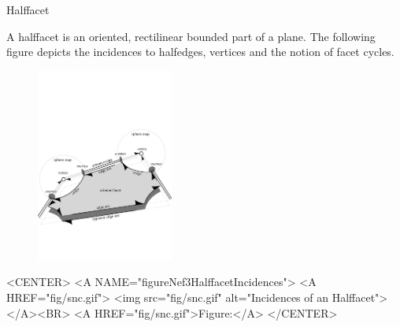 
\ccRefPageBegin



\begin{ccRefClass}{Halffacet}

\ccDefinition

A halffacet is an oriented, rectilinear bounded part of a plane. The following
figure depicts the incidences to halfedges, vertices and the notion of facet
cycles.

\begin{ccTexOnly}
    \begin{figure}[bht]
        \begin{center}
          \parbox{0.4\textwidth}{%
              \includegraphics[width=0.4\textwidth]{Nef_3_ref/fig/snc}%
          }
        \end{center}
        \label{figureNef3FacetIncidences}
    \end{figure}
\end{ccTexOnly}

\begin{ccHtmlOnly}
    <CENTER>
    <A NAME="figureNef3HalffacetIncidences">
    <A HREF="fig/snc.gif">
        <img src="fig/snc.gif" 
             alt="Incidences of an Halffacet"></A><BR>
    <A HREF="fig/snc.gif">Figure:</A>
    </CENTER>
\end{ccHtmlOnly}


\end{ccRefClass}
